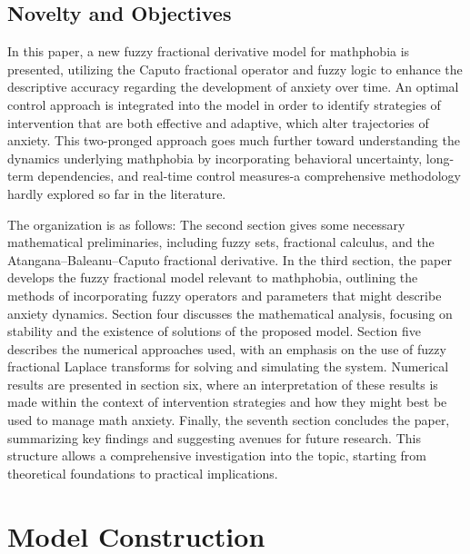 \documentclass[10pt]{NSP1}
\begin{document}
\subsection*{Novelty and Objectives}

In this paper, a new fuzzy fractional derivative model for mathphobia is presented, utilizing the Caputo fractional operator and fuzzy logic to enhance the descriptive accuracy regarding the development of anxiety over time. An optimal control approach is integrated into the model in order to identify strategies of intervention that are both effective and adaptive, which alter trajectories of anxiety. This two-pronged approach goes much further toward understanding the dynamics underlying mathphobia by incorporating behavioral uncertainty, long-term dependencies, and real-time control measures-a comprehensive methodology hardly explored so far in the literature.

The organization is as follows: The second section gives some necessary mathematical preliminaries, including fuzzy sets, fractional calculus, and the Atangana--Baleanu--Caputo fractional derivative. In the third section, the paper develops the fuzzy fractional model relevant to mathphobia, outlining the methods of incorporating fuzzy operators and parameters that might describe anxiety dynamics. Section four discusses the mathematical analysis, focusing on stability and the existence of solutions of the proposed model. Section five describes the numerical approaches used, with an emphasis on the use of fuzzy fractional Laplace transforms for solving and simulating the system. Numerical results are presented in section six, where an interpretation of these results is made within the context of intervention strategies and how they might best be used to manage math anxiety. Finally, the seventh section concludes the paper, summarizing key findings and suggesting avenues for future research. This structure allows a comprehensive investigation into the topic, starting from theoretical foundations to practical implications.

\section{Model Construction}
\end{document}
